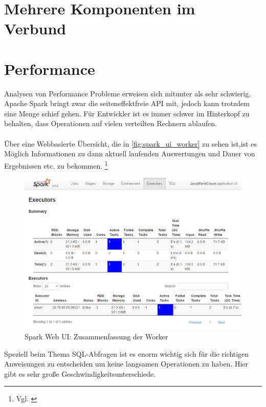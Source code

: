 \newpage
\section{Mehrere Komponenten im Verbund}

\newpage
\section{Performance}
Analysen von Performance Probleme erweisen sich mitunter als sehr schwierig. Apache Spark bringt zwar die seiteneffektfreie API mit, jedoch kann trotzdem eine Menge schief gehen. Für Entwickler ist es immer schwer im Hinterkopf zu behalten, dass Operationen auf vielen verteilten Rechnern ablaufen. \\ \\
Über eine Webbasierte Übersicht, die in \autoref{fig:spark_ui_worker} zu sehen ist,ist es Möglich Informationen zu dann aktuell laufenden Auswertungen und Dauer von Ergebnissen etc. zu bekommen. \footnote{Vgl. \cite[12]{AAWS15}}

\begin{figure}[h]
  \centering
  \includegraphics[width=\textwidth]{./bilder/spark_ui_worker.PNG}
  \caption{Spark Web UI: Zusammenfassung der Worker}\label{fig:spark_ui_worker}
\end{figure}

\noindent
Speziell beim Thema SQL-Abfragen ist es enorm wichtig sich für die richtigen Anweisungen zu entscheiden um keine langsamen Operationen zu haben. 
Hier gibt es sehr große Geschwindigkeitsunterschiede.




